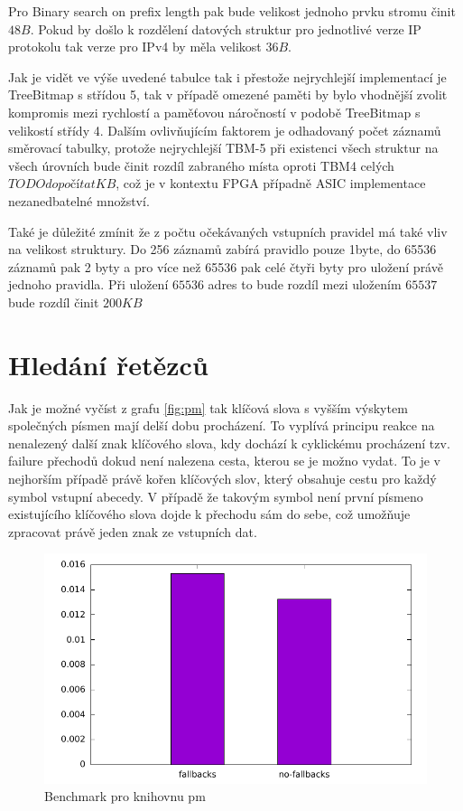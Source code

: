 Pro Binary search on prefix length pak bude velikost jednoho prvku stromu činit $48B$.
Pokud by došlo k rozdělení datových struktur pro jednotlivé verze IP protokolu
tak verze pro IPv4 by měla velikost $36B$.

Jak je vidět ve výše uvedené tabulce tak i přestože nejrychlejší implementací je TreeBitmap s střídou 5,
tak v případě omezené paměti by bylo vhodnější zvolit kompromis mezi rychlostí a paměťovou náročností v podobě
TreeBitmap s velikostí střídy 4. Dalším ovlivňujícím faktorem je odhadovaný počet záznamů směrovací tabulky, protože
nejrychlejší TBM-5 při existenci všech struktur na všech úrovních bude činit rozdíl zabraného místa oproti TBM4
celých $TODO dopočítat KB$, což je v kontextu FPGA případně ASIC implementace nezanedbatelné množství.

Také je důležité zmínit že z počtu očekávaných vstupních pravidel má také vliv na velikost struktury.
Do 256 záznamů zabírá pravidlo pouze 1byte, do 65536 záznamů pak 2 byty a pro více než 65536 pak celé čtyři byty pro uložení právě jednoho pravidla. Při uložení $65536$ adres to bude rozdíl mezi uložením $65537$ bude rozdíl činit
$200KB$





\section{Hledání řetězců}
Jak je možné vyčíst z grafu \ref{fig:pm} tak klíčová slova s vyšším výskytem společných písmen
mají delší dobu procházení. To vyplívá principu reakce na nenalezený další znak klíčového slova,
kdy dochází k cyklickému procházení tzv. failure přechodů dokud není nalezena cesta, kterou se je
možno vydat. To je v nejhorším případě právě kořen klíčových slov, který obsahuje cestu
pro každý symbol vstupní abecedy. V případě že takovým symbol není první písmeno
existujícího klíčového slova dojde k přechodu sám do sebe, což umožňuje zpracovat
právě jeden znak ze vstupních dat.

\begin{figure}[!htbp]
	\centering
	\includegraphics[scale=0.7]{fig/pm.pdf}
	\caption{Benchmark pro knihovnu pm}
\end{figure}\label{fig:pm}

